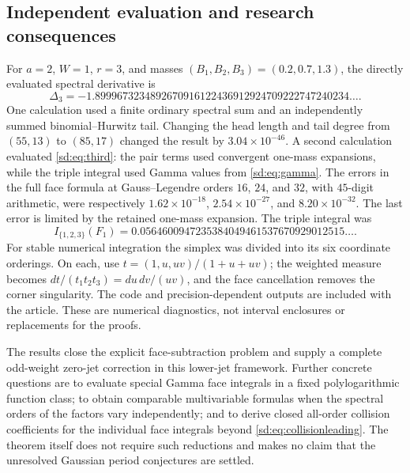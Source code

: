 \documentclass[11pt,a4paper]{article}
\numberwithin{equation}{section}
\theoremstyle{definition}
\theoremstyle{remark}
\begin{document}
\subsection{Independent evaluation and research consequences}
\label{sd:subsec:validation}

For $a=2$, $W=1$, $r=3$, and masses
$(B_1,B_2,B_3)=(0.2,0.7,1.3)$, the directly evaluated spectral derivative is
\begin{equation}\label{sd:eq:numeric}
 \Delta_3=-1.8999673234892670916122436912924709222747240234\ldots.
\end{equation}
One calculation used a finite ordinary spectral sum and an independently
summed binomial--Hurwitz tail.  Changing the head length and tail degree
from $(55,13)$ to $(85,17)$ changed the result by $3.04\times10^{-46}$.
A second calculation evaluated \eqref{sd:eq:third}: the pair terms used
convergent one-mass expansions, while the triple integral used Gamma
values from \eqref{sd:eq:gamma}.  The errors in the full face formula
at Gauss--Legendre orders $16$, $24$, and $32$, with $45$-digit
arithmetic, were respectively
$1.62\times10^{-18}$, $2.54\times10^{-27}$, and
$8.20\times10^{-32}$.  The last error is limited by the retained
one-mass expansion.  The triple integral was
\[
 I_{\{1,2,3\}}(F_1)
    =0.0564600947235384049461537670929012515\ldots.
\]
For stable numerical integration the simplex was divided into its six
coordinate orderings.  On each, use
$t=(1,u,uv)/(1+u+uv)$; the weighted measure becomes
$dt/(t_1t_2t_3)=du\,dv/(uv)$, and the face cancellation removes the
corner singularity.  The code and precision-dependent outputs are
included with the article.  These are numerical diagnostics, not
interval enclosures or replacements for the proofs.

The results close the explicit face-subtraction problem and supply a
complete odd-weight zero-jet correction in this lower-jet framework.
Further concrete questions are to evaluate special Gamma face integrals
in a fixed polylogarithmic function class; to obtain comparable
multivariable formulas when the spectral orders of the factors vary
independently; and to derive closed all-order collision coefficients for
the individual face integrals beyond \eqref{sd:eq:collisionleading}.
The theorem itself does not require such reductions and makes no claim
that the unresolved Gaussian period conjectures are settled.



\end{document}
